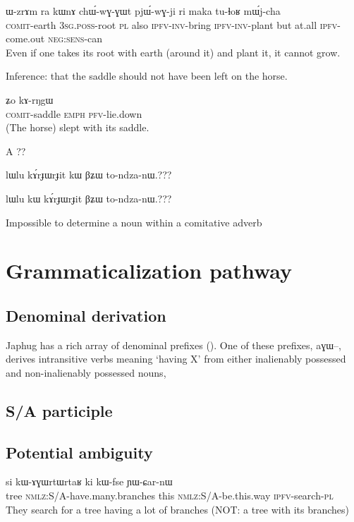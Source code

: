 \documentclass[oldfontcommands,oneside,a4paper,11pt]{article}
\newcommand{\ipa}[1]{{\phon #1}} %
\newcommand{\tld}{\textasciitilde{}}
\begin{document}
\begin{exe}
\ex
\gll \ipa{kɤ́-thɤlwɯ\tld{}lwa}  	\ipa{ɯ-zrɤm}  	\ipa{ra}  	\ipa{kɯnɤ}  	\ipa{chɯ́-wɣ-ɣɯt}  	\ipa{pjɯ́-wɣ-ji}  	\ipa{ri}  	\ipa{maka}  	\ipa{tu-ɬoʁ}  	\ipa{mɯ́j-cha}  \\
\textsc{comit}-earth \textsc{3sg.poss}-root \textsc{pl} also \textsc{ipfv-inv}-bring \textsc{ipfv-inv}-plant but at.all \textsc{ipfv}-come.out \textsc{neg:sens}-can \\
\glt Even if one takes its root with earth (around it) and plant it, it cannot grow.
\end{exe}


Inference: that the saddle should not have been left on the horse.
\begin{exe}
\ex
\gll \ipa{kɤ́-snɯ\tld{}sno}  	\ipa{ʑo}  	\ipa{kɤ-rŋgɯ}  \\
\textsc{comit}-saddle \textsc{emph} \textsc{pfv}-lie.down \\
\glt (The horse) slept with its saddle. 
\end{exe}

A ??

lɯlu kɤ́rɟɯrɟit kɯ βʑɯ to-ndza-nɯ.???

lɯlu kɯ kɤ́rɟɯrɟit βʑɯ to-ndza-nɯ.???


Impossible to determine a noun within a comitative adverb
\section{Grammaticalization pathway} 

\subsection{Denominal derivation}
Japhug has a rich array of denominal prefixes (\citealt{jacques14antipassive}). One of these prefixes, \ipa{aɣɯ--}, derives intransitive verbs meaning `having X' from either inalienably possessed and non-inalienably possessed nouns, 

\subsection{S/A participle}

\subsection{Potential ambiguity}
  
  \begin{exe}
\ex
\gll   
  \ipa{si} 	\ipa{kɯ-ɤɣɯrtɯrtaʁ} 	\ipa{ki} 	\ipa{kɯ-fse} 	\ipa{ɲɯ-ɕar-nɯ} \\
  tree \textsc{nmlz}:S/A-have.many.branches this \textsc{nmlz}:S/A-be.this.way \textsc{ipfv}-search-\textsc{pl} \\
\glt They search for a tree having a lot of branches (NOT: a tree with its branches)
\end{exe}
\end{document}
